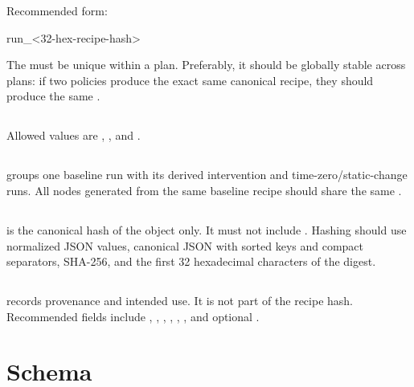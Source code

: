 \documentclass[11pt]{article}
\begin{document}
Recommended form:

\begin{DocCode}
run_<32-hex-recipe-hash>
\end{DocCode}

The  must be unique within a plan.
Preferably, it should be globally stable across plans: if two policies produce the exact same canonical recipe, they should produce the same .

\subsection*{}

Allowed values are , , and .

\subsection*{}

 groups one baseline run with its derived intervention and time-zero/static-change runs.
All nodes generated from the same baseline recipe should share the same .

\subsection*{}

 is the canonical hash of the  object only.
It must not include .
Hashing should use normalized JSON values, canonical JSON with sorted keys and compact separators, SHA-256, and the first 32 hexadecimal characters of the digest.

\subsection*{}

 records provenance and intended use.
It is not part of the recipe hash.
Recommended fields include , , , , , , and optional .

\section*{\texorpdfstring{}{recipe} Schema}
\end{document}
